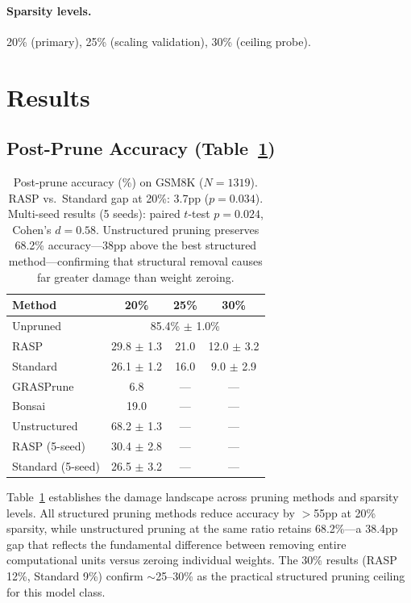 \documentclass[11pt,a4paper]{article}
\begin{document}
\paragraph{Sparsity levels.} 20\% (primary), 25\% (scaling validation), 30\% (ceiling probe).

\section{Results}

\subsection{Post-Prune Accuracy (Table~\ref{tab:postprune})}

\begin{table}[t]
\centering
\small
\begin{tabular}{lccc}
\toprule
\textbf{Method} & \textbf{20\%} & \textbf{25\%} & \textbf{30\%} \\
\midrule
Unpruned & \multicolumn{3}{c}{85.4\% $\pm$ 1.0\%} \\
\midrule
RASP & 29.8 $\pm$ 1.3 & 21.0 & 12.0 $\pm$ 3.2 \\
Standard & 26.1 $\pm$ 1.2 & 16.0 & 9.0 $\pm$ 2.9 \\
GRASPrune & 6.8 & --- & --- \\
Bonsai & 19.0 & --- & --- \\
Unstructured & 68.2 $\pm$ 1.3 & --- & --- \\
\midrule
RASP (5-seed) & 30.4 $\pm$ 2.8 & --- & --- \\
Standard (5-seed) & 26.5 $\pm$ 3.2 & --- & --- \\
\bottomrule
\end{tabular}
\caption{Post-prune accuracy (\%) on GSM8K ($N=1319$). RASP vs.\ Standard gap at 20\%: 3.7pp ($p=0.034$). Multi-seed results (5 seeds): paired $t$-test $p=0.024$, Cohen's $d=0.58$. Unstructured pruning preserves 68.2\% accuracy---38pp above the best structured method---confirming that structural removal causes far greater damage than weight zeroing.}
\label{tab:postprune}
\end{table}

Table~\ref{tab:postprune} establishes the damage landscape across pruning methods and sparsity levels. All structured pruning methods reduce accuracy by $>$55pp at 20\% sparsity, while unstructured pruning at the same ratio retains 68.2\%---a 38.4pp gap that reflects the fundamental difference between removing entire computational units versus zeroing individual weights. The 30\% results (RASP 12\%, Standard 9\%) confirm $\sim$25--30\% as the practical structured pruning ceiling for this model class.
\end{document}
